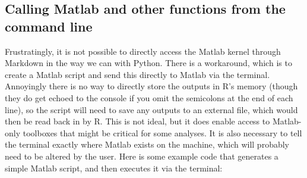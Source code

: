 \documentclass[
]{article}
\begin{document}
\hypertarget{calling-matlab-and-other-functions-from-the-command-line}{%
\subsection{Calling Matlab and other functions from the command line}\label{calling-matlab-and-other-functions-from-the-command-line}}

Frustratingly, it is not possible to directly access the Matlab kernel through Markdown in the way we can with Python. There is a workaround, which is to create a Matlab script and send this directly to Matlab via the terminal. Annoyingly there is no way to directly store the outputs in R's memory (though they do get echoed to the console if you omit the semicolons at the end of each line), so the script will need to save any outputs to an external file, which would then be read back in by R. This is not ideal, but it does enable access to Matlab-only toolboxes that might be critical for some analyses. It is also necessary to tell the terminal exactly where Matlab exists on the machine, which will probably need to be altered by the user. Here is some example code that generates a simple Matlab script, and then executes it via the terminal:
\end{document}
